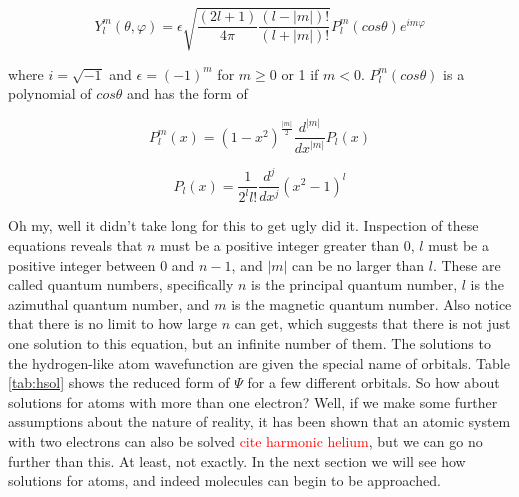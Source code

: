 \documentclass[12pt]{report}
\newcommand{\notetodylan}[1]{\textcolor{red}{#1}} %
\begin{document}
\begin{equation}
\label{eq:wavehydro_Y1}
Y^{m}_{l}(\theta,\varphi) = \epsilon\sqrt{\frac{(2l + 1)}{4\pi}\frac{(l-|m|)!}{(l+|m|)!}}P^{m}_{l}(cos\theta)e^{im\varphi}
\end{equation}

where $i=\sqrt{-1}$ and $\epsilon = (-1)^{m}$ for $m \geq 0$ or 1 if  $m < 0$. $P^{m}_{l}(cos\theta)$ is a polynomial of $cos\theta$ and has the form of

\begin{equation}
\label{eq:wavehydro_Y2}
P^{m}_{l}(x) = (1 - x^{2})^{\frac{|m|}{2}}\frac{d^{|m|}}{dx^{|m|}}P_{l}(x)
\end{equation}

\begin{equation}
\label{eq:wavehydro_Y3}
P_{l}(x) = \frac{1}{2^{l}l!}\frac{d^{j}}{dx^{j}}(x^{2}-1)^{l}
\end{equation} 

Oh my, well it didn't take long for this to get ugly did it. Inspection of these equations reveals that $n$ must be a positive integer greater than 0, $l$ must be a positive integer between 0 and $n-1$, and $|m|$ can be no larger than $l$. These are called quantum numbers, specifically $n$ is the principal quantum number, $l$ is the azimuthal quantum number, and $m$ is the magnetic quantum number. Also notice that there is no limit to how large $n$ can get, which suggests that there is not just one solution to this equation, but an infinite number of them. The solutions to the hydrogen-like atom wavefunction are given the special name of orbitals. Table \ref{tab:hsol} shows the reduced form of $\Psi$ for a few different orbitals. So how about solutions for atoms with more than one electron? Well, if we make some further assumptions about the nature of reality, it has been shown that an atomic system with two electrons can also be solved \notetodylan{cite harmonic helium}, but we can go no further than this. At least, not exactly. In the next section we will see how solutions for atoms, and indeed molecules can begin to be approached.
\end{document}
